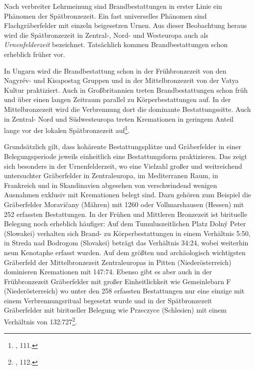 \documentclass[openany,twoside,twocolumn]{book}
\let\rmarkdownfootnote\footnote%
\def\footnote{\protect\rmarkdownfootnote}
\begin{document}
Nach verbreiter Lehrmeinung sind Brandbestattungen in erster Linie ein
Phänomen der Spätbronzezeit. Ein fast universelles Phänomen sind
Flachgräberfelder mit einzeln beigesetzen Urnen. Aus dieser Beobachtung
heraus wird die Spätbronzezeit in Zentral-, Nord- und Westeuropa auch
als \emph{Urnenfelderzeit} bezeichnet. Tatsächlich kommen
Brandbestattungen schon erheblich früher vor.

In Ungarn wird die Brandbestattung schon in der Frühbronzezeit von den
Nagyrév- und Kisapostag Gruppen und in der Mittelbronzezeit von der
Vatya Kultur praktiziert. Auch in Großbritannien treten
Brandbestattungen schon früh und über einen langen Zeitraum parallel zu
Körperbestattungen auf. In der Mittelbronzezeit wird die Verbrennung
dort die dominante Bestattungssitte. Auch in Zentral- Nord und
Südwesteuropa treten Kremationen in geringem Anteil lange vor der
lokalen Spätbronzezeit auf\footnote{\textcite{harding_european_2000},
  111.}.

Grundsätzlich gilt, dass kohärente Bestattungsplätze und Gräberfelder in
einer Belegungsperiode jeweils einheitlich eine Bestattungsform
praktizieren. Das zeigt sich besonders in der Urnenfelderzeit, wo eine
Vielzahl großer und weitreichend untersuchter Gräberfelder in
Zentraleuropa, im Mediterranen Raum, in Frankreich und in Skandinavien
abgesehen von verschwindend wenigen Ausnahmen exklusiv mit Kremationen
belegt sind. Dazu gehören zum Beispiel die Gräberfelder Moravičany
(Mähren) mit 1260 oder Vollmarshausen (Hessen) mit 252 erfassten
Bestattungen. In der Frühen und Mittleren Bronzezeit ist birituelle
Belegung noch erheblich häufiger: Auf dem Tumuluszeitlichen Platz Dolný
Peter (Slowakei) verhalten sich Brand- zu Körperbestattungen in einem
Verhältnis 5:50, in Streda nad Bodrogom (Slovakei) beträgt das
Verhältnis 34:24, wobei weiterhin neun Kenotaphe erfasst wurden. Auf dem
größten und archäologisch wichtigsten Gräberfeld der Mittelbronzezeit
Zentraleuropas in Pitten (Niederösterreich) dominieren Kremationen mit
147:74. Ebenso gibt es aber auch in der Frühbronzezeit Gräberfelder mit
großer Einheitlichkeit wie Gemeinlebarn F (Niederösterreich) wo unter
den 258 erfassten Bestattungen nur eine einzige mit einem
Verbrennungsritual begesetzt wurde und in der Spätbronzezeit
Gräberfelder mit biritueller Belegung wie Przeczyce (Schlesien) mit
einem Verhältnis von 132:727\footnote{\textcite{harding_european_2000},
  112.}.
\end{document}

